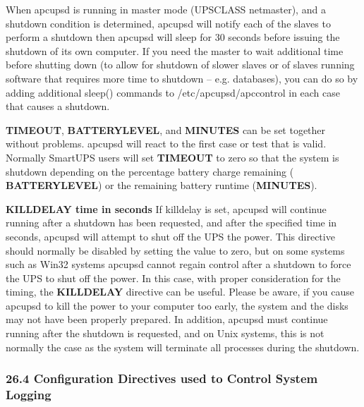 {{{{{{{{{{{\begin{description}
When apcupsd is running in master mode (UPSCLASS netmaster), and a shutdown
condition is determined, apcupsd will notify each of the slaves to perform a
shutdown then apcupsd will sleep for 30 seconds before issuing the shutdown of
its own computer. If you need the master to wait additional time before
shutting down (to allow for shutdown of slower slaves or of slaves running
software that requires more time to shutdown {--} e.g. databases), you can do
so by adding additional sleep() commands to /etc/apcupsd/apccontrol in each
case that causes a shutdown.  

{\bf TIMEOUT}, {\bf BATTERYLEVEL}, and {\bf MINUTES} can be set together
without problems.  apcupsd will react to the first case or test that is valid.
Normally SmartUPS users will set {\bf TIMEOUT} to zero so that the system is
shutdown depending on the percentage battery charge remaining ({\bf
BATTERYLEVEL}) or the remaining battery runtime ({\bf MINUTES}).  

\label{KILLDELAY-_003ctime-in-seconds_003e}

\item {\bf KILLDELAY \lt{}time in seconds\gt{}}
If killdelay is set, apcupsd will continue running after a shutdown has been
requested, and after the specified time in seconds, apcupsd will attempt to
shut off the UPS the power. This directive should normally be disabled by
setting the value to zero, but on some systems such as Win32 systems apcupsd
cannot regain control after a shutdown to force the UPS to shut off the power.
In this case, with proper consideration for the timing, the {\bf KILLDELAY}
directive can be useful.  Please be aware, if you cause apcupsd to kill the
power to your computer too early, the system and the disks may not have been
properly prepared.  In addition, apcupsd must continue running after the
shutdown is requested, and on Unix systems, this is not normally the case as
the system will terminate all processes during the shutdown.  
\end{description}

\label{Configuration-Directives-used-to-Control-System-Logging}

\subsubsection*{26.4 Configuration Directives used to Control System Logging}

}}}}}}}}}}}
